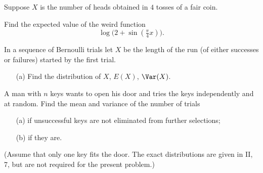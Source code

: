 \begin{problem}[Handout 7, \# 15]
  Suppose \(X\) is the number of heads obtained in \(4\) tosses of a fair
  coin.

  Find the expected value of the weird function
  \[
    \log\bigl( 2+\sin(\tfrac{\pi}{4}x) \bigr).
  \]
\end{problem}
\begin{solution}

\end{solution}
\newpage

\begin{problem}[Handout 7, \# 16]
  In a sequence of Bernoulli trials let \(X\) be the length of the run (of
  either successes or failures) started by the first trial.
  \begin{itemize}[noitemsep]
  \item[(a)] Find the distribution of \(X\), \(E(X)\), \(\Var(X)\).
  \end{itemize}
\end{problem}
\begin{solution}

\end{solution}
\newpage

\begin{problem}[Handout 7, \# 17]
  A man with \(n\) keys wants to open his door and tries the keys
  independently and at random. Find the mean and variance of the number of
  trials
  \begin{itemize}[noitemsep]
  \item[(a)] if unsuccessful keys are not eliminated from further
    selections;
  \item[(b)] if they are.
  \end{itemize}
  (Assume that only one key fits the door. The exact distributions are
  given in II, 7, but are not required for the present problem.)
\end{problem}
\begin{solution}

\end{solution}

